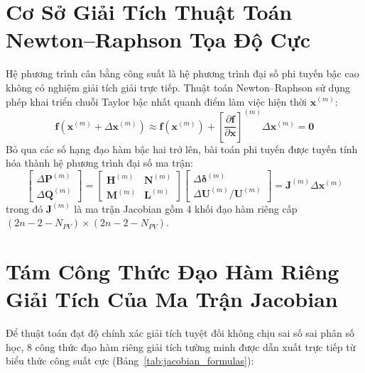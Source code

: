 \documentclass[12pt,a4paper,oneside]{report}
\begin{document}
\section{Cơ Sở Giải Tích Thuật Toán Newton--Raphson Tọa Độ Cực}
Hệ phương trình cân bằng công suất là hệ phương trình đại số phi tuyến bậc cao không có nghiệm giải tích giải trực tiếp. Thuật toán Newton--Raphson sử dụng phép khai triển chuỗi Taylor bậc nhất quanh điểm làm việc hiện thời $\mathbf{x}^{(m)}$:
\begin{equation}
\mathbf{f}(\mathbf{x}^{(m)} + \Delta \mathbf{x}^{(m)}) \approx \mathbf{f}(\mathbf{x}^{(m)}) + \left[ \frac{\partial \mathbf{f}}{\partial \mathbf{x}} \right]^{(m)} \Delta \mathbf{x}^{(m)} = \mathbf{0}
\end{equation}
Bỏ qua các số hạng đạo hàm bậc hai trở lên, bài toán phi tuyến được tuyến tính hóa thành hệ phương trình đại số ma trận:
\begin{equation}
\begin{bmatrix}
\Delta \mathbf{P}^{(m)} \\[4pt]
\Delta \mathbf{Q}^{(m)}
\end{bmatrix}
=
\begin{bmatrix}
\mathbf{H}^{(m)} & \mathbf{N}^{(m)} \\[4pt]
\mathbf{M}^{(m)} & \mathbf{L}^{(m)}
\end{bmatrix}
\begin{bmatrix}
\Delta \boldsymbol{\delta}^{(m)} \\[4pt]
\Delta \mathbf{U}^{(m)} / \mathbf{U}^{(m)}
\end{bmatrix}
= \mathbf{J}^{(m)} \Delta \mathbf{x}^{(m)}
\end{equation}
trong đó $\mathbf{J}^{(m)}$ là ma trận Jacobian gồm 4 khối đạo hàm riêng cấp $(2n - 2 - N_{PV}) \times (2n - 2 - N_{PV})$.

\section{Tám Công Thức Đạo Hàm Riêng Giải Tích Của Ma Trận Jacobian}
Để thuật toán đạt độ chính xác giải tích tuyệt đối không chịu sai số sai phân số học, 8 công thức đạo hàm riêng giải tích tường minh được dẫn xuất trực tiếp từ biểu thức công suất cực (Bảng~\ref{tab:jacobian_formulas}):
\end{document}
